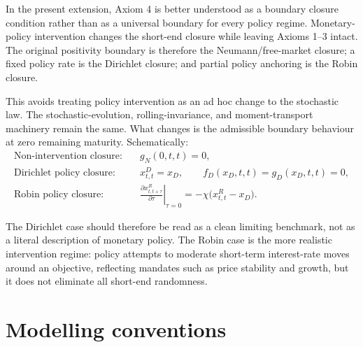 \documentclass[11pt]{article}
\numberwithin{equation}{section}
\begin{document}
In the present extension, Axiom 4 is better understood as a boundary closure condition rather than as a universal boundary for every policy regime. Monetary-policy intervention changes the short-end closure while leaving Axioms 1--3 intact. The original positivity boundary is therefore the Neumann/free-market closure; a fixed policy rate is the Dirichlet closure; and partial policy anchoring is the Robin closure.

This avoids treating policy intervention as an ad hoc change to the stochastic law. The stochastic-evolution, rolling-invariance, and moment-transport machinery remain the same. What changes is the admissible boundary behaviour at zero remaining maturity. Schematically:
\begin{align*}
\text{Non-intervention closure:} \quad & g_N(0,t,t)=0,\\
\text{Dirichlet policy closure:} \quad & x^D_{t,t}=x_D,\qquad f_D(x_D,t,t)=g_D(x_D,t,t)=0,\\
\text{Robin policy closure:} \quad & \left.\frac{\partial x^R_{t,t+\tau}}{\partial \tau}\right|_{\tau=0}=-\chi\bigl(x^R_{t,t}-x_D\bigr).
\end{align*}

The Dirichlet case should therefore be read as a clean limiting benchmark, not as a literal description of monetary policy. The Robin case is the more realistic intervention regime: policy attempts to moderate short-term interest-rate moves around an objective, reflecting mandates such as price stability and growth, but it does not eliminate all short-end randomness.

\section{Modelling conventions}
\end{document}
